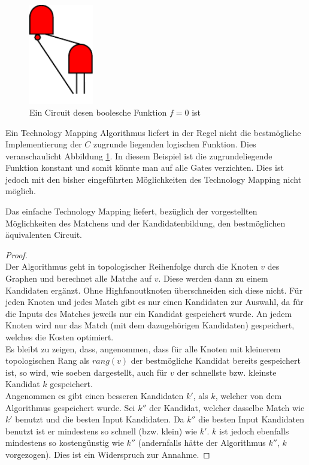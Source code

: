 \documentclass[11pt, a4paper, german]{article}
\newcommand{\TM}{Technology  Mapping }
\begin{document}
\begin{figure}
		\includegraphics[width = 2.8cm]{pictures/compiled/compl_redundant}
		\caption{Ein Circuit desen boolesche Funktion $f = 0 $ ist}
		\label{bild:compl_redundant}
\end{figure}
Ein \TM Algorithmus liefert in der Regel nicht die bestmögliche Implementierung der $C$ zugrunde liegenden logischen Funktion. Dies veranschaulicht Abbildung \ref{bild:compl_redundant}. In diesem Beispiel ist die zugrundeliegende Funktion konstant und somit könnte man auf alle Gates verzichten. Dies ist jedoch mit den bisher eingeführten Möglichkeiten des \TM nicht möglich. \\

\begin{cor}
	Das einfache \TM  liefert, bezüglich der vorgestellten Möglichkeiten des Matchens und der Kandidatenbildung, den bestmöglichen äquivalenten Circuit.
\end{cor}
\begin{proof} \ \\
	Der Algorithmus geht in topologischer Reihenfolge durch die Knoten $v$ des Graphen und berechnet alle Matche auf $v$. Diese werden dann zu einem Kandidaten ergänzt. 
 Ohne Highfanoutknoten überschneiden sich diese nicht. Für jeden Knoten und jedes Match gibt es nur einen Kandidaten zur Auswahl, da für die Inputs des Matches jeweils nur ein Kandidat gespeichert wurde. An jedem Knoten wird nur das Match (mit dem dazugehörigen Kandidaten) gespeichert, welches die Kosten optimiert. \\
 Es bleibt zu zeigen, dass, angenommen, dass für alle Knoten mit kleinerem topologischen Rang als $rang(v)$ der bestmögliche Kandidat bereits gespeichert ist, so wird, wie soeben dargestellt, auch für $v$ der schnellste bzw. kleinste Kandidat $k$ gespeichert. \\
 Angenommen es gibt einen besseren Kandidaten $k'$, als $k$, welcher von dem Algorithmus gespeichert wurde. Sei $k''$ der Kandidat, welcher dasselbe Match wie $k'$ benutzt und die besten Input Kandidaten. Da $k''$ die besten Input Kandidaten benutzt ist er mindestens so schnell (bzw. klein) wie $k'$. $k$ ist jedoch ebenfalls mindestens so kostengünstig wie $k''$ (andernfalls hätte der Algorithmus $k''$, $k$ vorgezogen). Dies ist ein Widerspruch zur Annahme. 
\end{proof}
 
\end{document}
